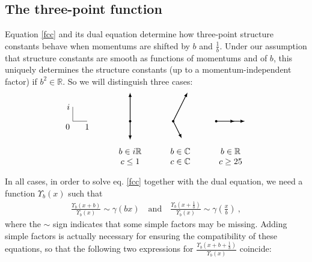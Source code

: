 \documentclass[12pt, a4paper, notitlepage, twoside]{report}
\numberwithin{equation}{section}
\theoremstyle{break}
\begin{document}
\subsection{The three-point function \label{sectpf}}

Equation \eqref{fcc} and its dual equation determine how three-point structure constants behave when momentums are shifted by $b$ and $\frac{1}{b}$. 
Under our assumption that structure constants are smooth as functions of momentums and of $b$, this uniquely determines the structure constants (up to a momentum-independent factor) if $b^2\in \mathbb{R}$.
So we will distinguish three cases:
\begin{equation}
 \begin{tikzpicture}[baseline=(current  bounding  box.center), scale = .6]
\draw (0, 2) node[left]{$i$} -- (0, 1) node[below left] {$0$} -- (1, 1) node[below] {$1$};
\draw [thick, latex-latex] (4,3) -- (4,1) node[fill, circle, minimum size = 1mm, inner sep = 0]{} -- (4,-.3);
\draw [thick, latex-latex] (8,3) -- (7,1) node[fill, circle, minimum size = 1mm, inner sep = 0]{}-- (7.6,-.2);
\draw [thick, latex-latex] (12,1) -- (10,1) node[fill, circle, minimum size = 1mm, inner sep = 0]{} -- (11.3,1) ;
\node at (4, -1.5){$\begin{array}{c} b\in i\mathbb{R} \\ c\leq 1 \end{array}$};
\node at (7.5, -1.5){$\begin{array}{c} b\in \mathbb{C} \\ c\in\mathbb{C} \end{array}$};
\node at (11, -1.5){$\begin{array}{c} b\in \mathbb{R} \\ c\geq 25 \end{array}$};
 \end{tikzpicture}
\end{equation}
In all cases, in order to solve eq. \eqref{fcc} together with the dual equation, we need a function $\Upsilon_b(x)$ such that 
\begin{align}
 \frac{\Upsilon_b(x+b)}{\Upsilon_b(x)} \sim \gamma(bx)\quad \text{and} \quad \frac{\Upsilon_b(x+\frac{1}{b})}{\Upsilon_b(x)} \sim \gamma(\tfrac{x}{b})\ ,
\end{align}
where the $\sim$ sign indicates that some simple factors may be missing.
Adding simple factors is actually necessary for ensuring the compatibility of these equations, so that the following two expressions for $ \frac{\Upsilon_b(x+b+\frac{1}{b})}{\Upsilon_b(x)}$ coincide:
\end{document}
